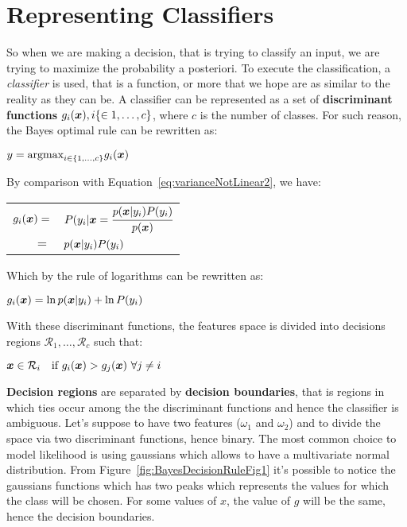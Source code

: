 \section{Representing Classifiers}
So when we are making a decision, that is trying to classify an input, we are trying to maximize the probability a posteriori. To execute the classification, a \textit{classifier} is used, that is a function, or more that we hope are as similar to the reality as they can be. \newline
A classifier can be represented as a set of \textbf{discriminant functions} $g_i(\bm{x}), i\{\in1,\hdots,c\}$, where $c$ is the number of classes. For such reason, the Bayes optimal rule can be rewritten as:
\begin{center}
	$\displaystyle y=\text{argmax}_{i\in\{1,\hdots, c\}}g_i(\bm{x})$
\end{center}
By comparison with Equation~\ref{eq:varianceNotLinear2}, we have:
\begin{center}
\begin{tabular}{rl}
	$\displaystyle g_i(\bm{x})=$&$P(y_i\vert \bm{x}=\cfrac{p(\bm{x}\vert y_i)P(y_i)}{p(\bm{x})}$\\
	$=$&$p(\bm{x}\vert y_i)P(y_i)$
\end{tabular}
\end{center}
Which by the rule of logarithms can be rewritten as:
\begin{center}
	$\displaystyle g_i(\bm{x})=\ln{p(\bm{x}\vert y_i)}+\ln{P(y_i)}$
\end{center}
With these discriminant functions, the features space is divided into decisions regions $\mathcal{R}_1,\hdots,\mathcal{R}_c$ such that:
\begin{center}
	$\displaystyle \bm{x}\in\mathcal{R}_i\quad \text{if }g_i(\bm{x})>g_j(\bm{x})~\forall j\neq i$
\end{center}
\textbf{Decision regions} are separated by \textbf{decision boundaries}, that is regions in which ties occur among the the discriminant functions and hence the classifier is ambiguous. \newline
Let's suppose to have two features ($\omega_1$ and $\omega_2$) and to divide the space via two discriminant functions, hence binary. The most common choice to model likelihood is using gaussians which allows to have a multivariate normal distribution. From Figure~\ref{fig:BayesDecisionRuleFig1} it's possible to notice the gaussians functions which has two peaks which represents the values for which the class will be chosen. For some values of $x$, the value of $g$ will be the same, hence the decision boundaries. 
